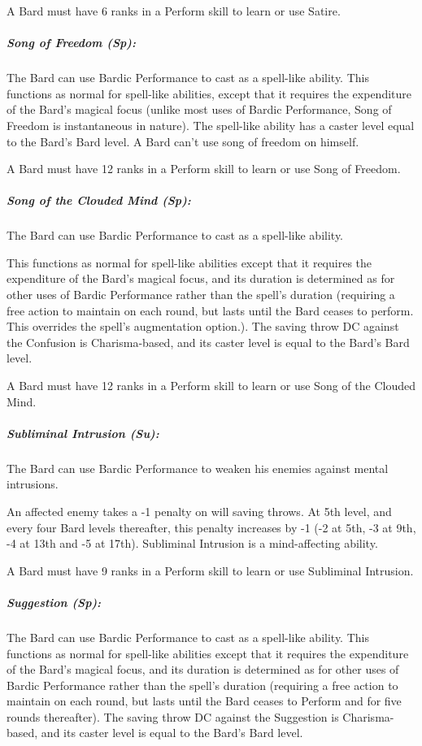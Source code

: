 A Bard must have 6 ranks in a Perform skill to learn or use Satire.
\subparagraph{Song of Freedom (Sp):}
The Bard can use Bardic Performance to cast  as a spell-like ability. This functions as normal for spell-like abilities, except that it requires the expenditure of the Bard's magical focus (unlike most uses of Bardic Performance, Song of Freedom is instantaneous in nature). The spell-like ability has a caster level equal to the Bard's Bard level.
A Bard can't use song of freedom on himself.

A Bard must have 12 ranks in a Perform skill to learn or use Song of Freedom.
\subparagraph{Song of the Clouded Mind (Sp):}
The Bard can use Bardic Performance to cast  as a spell-like ability.

This functions as normal for spell-like abilities except that it requires the expenditure of the Bard's magical focus, and its duration is determined as for other uses of Bardic Performance rather than the spell's duration (requiring a free action to maintain on each round, but lasts until the Bard ceases to perform. This overrides the spell's augmentation option.).
The saving throw DC against the Confusion is Charisma-based, and its caster level is equal to the Bard's Bard level.

A Bard must have 12 ranks in a Perform skill to learn or use Song of the Clouded Mind.
\subparagraph{Subliminal Intrusion (Su):}
The Bard can use Bardic Performance to weaken his enemies against mental intrusions.

An affected enemy takes a -1 penalty on will saving throws. At 5th level, and every four Bard levels thereafter, this penalty increases by -1 (-2 at 5th, -3 at 9th, -4 at 13th and -5 at 17th). Subliminal Intrusion is a mind-affecting ability.

A Bard must have 9 ranks in a Perform skill to learn or use Subliminal Intrusion.
\subparagraph{Suggestion (Sp):}
The Bard can use Bardic Performance to cast  as a spell-like ability. 
This functions as normal for spell-like abilities except that it requires the expenditure of the Bard's magical focus, and its duration is determined as for other uses of Bardic Performance rather than the spell's duration (requiring a free action to maintain on each round, but lasts until the Bard ceases to Perform and for five rounds thereafter).
The saving throw DC against the Suggestion is Charisma-based, and its caster level is equal to the Bard's Bard level.

